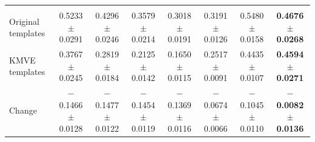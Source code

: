 \begin{table}[p]
\begin{threeparttable}
\begin{tabular}{lccccccc}
\midrule
\rowcolor{gray!20}
\multicolumn{8}{c}{\textbf{ZJH-TS Testset} ($n=150$)} \\
Original templates
& 0.5233$\pm$0.0291
& 0.4296$\pm$0.0246
& 0.3579$\pm$0.0214
& 0.3018$\pm$0.0191
& 0.3191$\pm$0.0126
& 0.5480$\pm$0.0158
& \textbf{0.4676$\pm$0.0268} \\
KMVE templates
& 0.3767$\pm$0.0245
& 0.2819$\pm$0.0184
& 0.2125$\pm$0.0142
& 0.1650$\pm$0.0115
& 0.2517$\pm$0.0091
& 0.4435$\pm$0.0107
& \textbf{0.4594$\pm$0.0271} \\
\quad Change
& $-$0.1466$\pm$0.0128
& $-$0.1477$\pm$0.0122
& $-$0.1454$\pm$0.0119
& $-$0.1369$\pm$0.0116
& $-$0.0674$\pm$0.0066
& $-$0.1045$\pm$0.0110
& \textbf{$-$0.0082$\pm$0.0136} \\

\bottomrule
\end{tabular}

\end{threeparttable}
\end{table}
